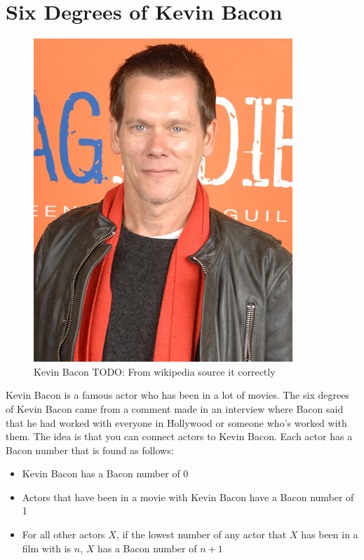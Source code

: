 \label{Ch:KB}


\section*{Six Degrees of Kevin Bacon}

\begin{figure}[H]
\includegraphics[scale = .4]{Kevin_Bacon.jpg}
\caption{Kevin Bacon TODO: From wikipedia source it correctly}
\end{figure}

Kevin Bacon is a famous actor who has been in a lot of movies. The six degrees of Kevin Bacon came from a comment made in an interview where Bacon said that he had worked with everyone in Hollywood or someone who's worked with them.  The idea is that you can connect actors to Kevin Bacon. Each actor has a Bacon number that is found as follows:
\begin{itemize}
\item Kevin Bacon has a Bacon number  of 0
\item Actors that have been in a movie with Kevin Bacon have a Bacon number of 1
\item For all other actors $X$, if the lowest number of any actor that $X$ has been in a film with is $n$, $X$ has a Bacon number of $n+1$
\end{itemize}

